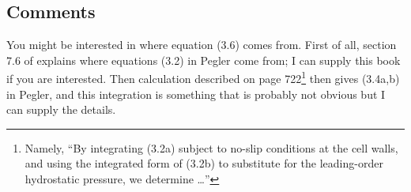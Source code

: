\documentclass[11pt,final]{amsart}%
\begin{document}
\subsection*{Comments}  You might be interested in where equation (3.6) comes from.  First of all, section 7.6 of \cite{Acheson} explains where equations (3.2) in Pegler come from; I can supply this book if you are interested.  Then calculation described on page 722\footnote{Namely, ``By integrating (3.2a) subject to no-slip conditions at the cell walls, and using the integrated form of (3.2b) to substitute for the leading-order hydrostatic pressure, we determine \dots''} then gives (3.4a,b) in Pegler, and this integration is something that is probably not obvious but I can supply the details.


\small

\end{document}
